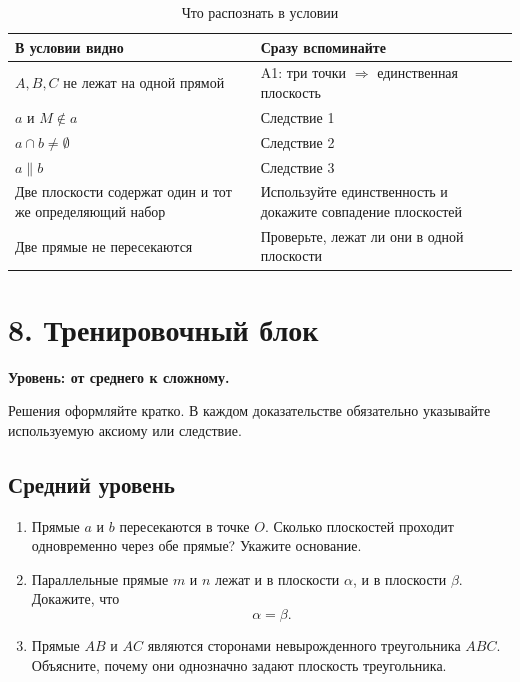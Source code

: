\documentclass[a4paper,12pt]{article}
\begin{document}
\begin{table}[htbp]
\centering
\caption{Что распознать в условии}

\begin{tabularx}{\linewidth}{@{}X X@{}}
\toprule

\textbf{В условии видно}
&
\textbf{Сразу вспоминайте}
\\
\midrule

$A,B,C$ не лежат на одной прямой
&
A1:
три точки $\Rightarrow$ единственная плоскость
\\

$a$ и $M\notin a$
&
Следствие 1
\\

$a\cap b\ne\emptyset$
&
Следствие 2
\\

$a\parallel b$
&
Следствие 3
\\

Две плоскости содержат
один и тот же определяющий набор
&
Используйте единственность и докажите
совпадение плоскостей
\\

Две прямые не пересекаются
&
Проверьте, лежат ли они в одной плоскости
\\

\bottomrule
\end{tabularx}
\end{table}


\clearpage

\section*{8. Тренировочный блок}

\textbf{Уровень: от среднего к сложному.}

Решения оформляйте кратко.
В каждом доказательстве обязательно указывайте
используемую аксиому или следствие.

\subsection*{Средний уровень}

\begin{enumerate}

    \item
    Прямые $a$ и $b$ пересекаются в точке $O$.
    Сколько плоскостей проходит одновременно через обе прямые?
    Укажите основание.

    \item
    Параллельные прямые $m$ и $n$ лежат
    и в плоскости $\alpha$, и в плоскости $\beta$.
    Докажите, что
    \[
    \alpha=\beta.
    \]

    \item
    Прямые $AB$ и $AC$ являются сторонами
    невырожденного треугольника $ABC$.
    Объясните, почему они однозначно задают
    плоскость треугольника.

\end{enumerate}
\end{document}
